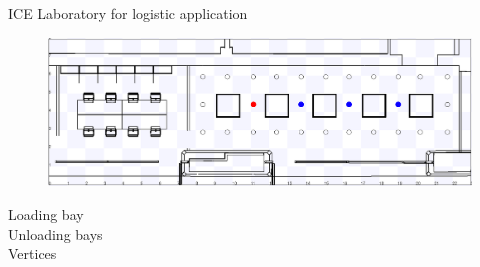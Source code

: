     \begin{frame}[fragile]{ICE Laboratory for logistic application}
        \begin{figure}[hbt]
            \centering
            \includegraphics[width=\textwidth]{img/labgrafo}
        \end{figure}

        {\color{red}{$\bullet$}}  Loading bay
        \\
        {\color{blue}{$\bullet$}}  Unloading bays
        \\
        {\color{black}{$\circ$}}  Vertices
    \end{frame}

